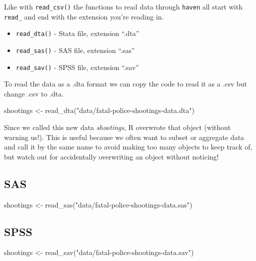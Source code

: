 \documentclass[
]{krantz}
\makeatletter
\newenvironment{Shaded}{\begin{snugshade}}{\end{snugshade}}
\newcommand{\FunctionTok}[1]{\textcolor[rgb]{0,0,0}{#1}}
\newcommand{\NormalTok}[1]{#1}
\newcommand{\OtherTok}[1]{\textcolor[rgb]{0.37,0.37,0.37}{#1}}
\newcommand{\StringTok}[1]{\textcolor[rgb]{0.5,0.5,0.5}{#1}}
\providecommand{\tightlist}{%
  \setlength{\itemsep}{0pt}\setlength{\parskip}{0pt}}
\newenvironment{kframe}{%
\medskip{}
\setlength{\fboxsep}{.8em}
 \def\at@end@of@kframe{}%
 \ifinner\ifhmode%
  \def\at@end@of@kframe{\end{minipage}}%
  \begin{minipage}{\columnwidth}%
 \fi\fi%
 \def\FrameCommand##1{\hskip\@totalleftmargin \hskip-\fboxsep
 \colorbox{shadecolor}{##1}\hskip-\fboxsep
     \hskip-\linewidth \hskip-\@totalleftmargin \hskip\columnwidth}%
 \MakeFramed {\advance\hsize-\width
   \@totalleftmargin\z@ \linewidth\hsize
   \@setminipage}}%
 {\par\unskip\endMakeFramed%
 \at@end@of@kframe}
\renewenvironment{Shaded}{\begin{kframe}}{\end{kframe}}
\makeatother
\begin{document}
Like with \texttt{read\_csv()} the functions to read data through \texttt{haven} all start with \texttt{read\_} and end with the extension you're reading in.

\begin{itemize}
\tightlist
\item
  \texttt{read\_dta()} - Stata file, extension ``.dta''
\item
  \texttt{read\_sas()} - SAS file, extension ``.sas''
\item
  \texttt{read\_sav()} - SPSS file, extension ``.sav''
\end{itemize}

To read the data as a .dta format we can copy the code to read it as a .csv but change .csv to .dta.

\begin{Shaded}
\begin{Highlighting}[]
\NormalTok{shootings }\OtherTok{\textless{}{-}} \FunctionTok{read\_dta}\NormalTok{(}\StringTok{"data/fatal{-}police{-}shootings{-}data.dta"}\NormalTok{)}
\end{Highlighting}
\end{Shaded}

Since we called this new data \emph{shootings}, R overwrote that object (without warning us!). This is useful because we often want to subset or aggregate data and call it by the same name to avoid making too many objects to keep track of, but watch out for accidentally overwriting an object without noticing!

\hypertarget{sas}{%
\subsection{SAS}\label{sas}}

\begin{Shaded}
\begin{Highlighting}[]
\NormalTok{shootings }\OtherTok{\textless{}{-}} \FunctionTok{read\_sas}\NormalTok{(}\StringTok{"data/fatal{-}police{-}shootings{-}data.sas"}\NormalTok{)}
\end{Highlighting}
\end{Shaded}

\hypertarget{spss}{%
\subsection{SPSS}\label{spss}}

\begin{Shaded}
\begin{Highlighting}[]
\NormalTok{shootings }\OtherTok{\textless{}{-}} \FunctionTok{read\_sav}\NormalTok{(}\StringTok{"data/fatal{-}police{-}shootings{-}data.sav"}\NormalTok{)}
\end{Highlighting}
\end{Shaded}
\end{document}
